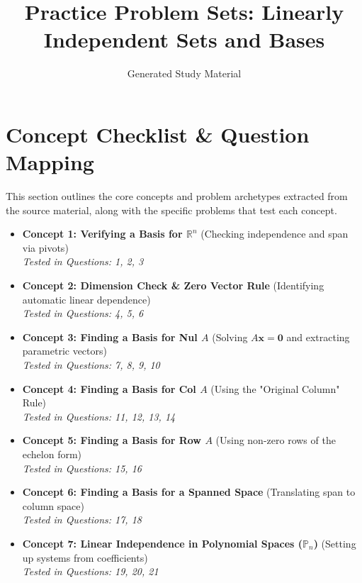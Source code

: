 \documentclass[11pt]{article}
\title{Practice Problem Sets: Linearly Independent Sets and Bases}
\author{Generated Study Material}
\date{}
\begin{document}
\maketitle
\tableofcontents
\newpage

\section{Concept Checklist \& Question Mapping}
This section outlines the core concepts and problem archetypes extracted from the source material, along with the specific problems that test each concept.

\begin{itemize}
    \item \textbf{Concept 1: Verifying a Basis for $\mathbb{R}^n$} (Checking independence and span via pivots) \\
    \textit{Tested in Questions: 1, 2, 3}
    
    \item \textbf{Concept 2: Dimension Check \& Zero Vector Rule} (Identifying automatic linear dependence) \\
    \textit{Tested in Questions: 4, 5, 6}
    
    \item \textbf{Concept 3: Finding a Basis for Nul $A$} (Solving $A\mathbf{x} = \mathbf{0}$ and extracting parametric vectors) \\
    \textit{Tested in Questions: 7, 8, 9, 10}
    
    \item \textbf{Concept 4: Finding a Basis for Col $A$} (Using the "Original Column" Rule) \\
    \textit{Tested in Questions: 11, 12, 13, 14}
    
    \item \textbf{Concept 5: Finding a Basis for Row $A$} (Using non-zero rows of the echelon form) \\
    \textit{Tested in Questions: 15, 16}
    
    \item \textbf{Concept 6: Finding a Basis for a Spanned Space} (Translating span to column space) \\
    \textit{Tested in Questions: 17, 18}
    
    \item \textbf{Concept 7: Linear Independence in Polynomial Spaces ($\mathbb{P}_n$)} (Setting up systems from coefficients) \\
    \textit{Tested in Questions: 19, 20, 21}
    

\end{itemize}
\end{document}

